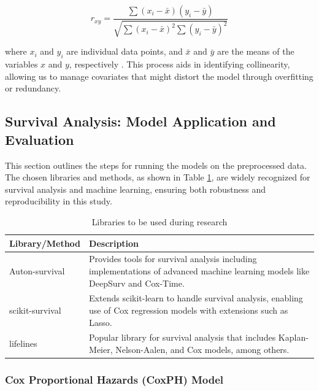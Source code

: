 \[
r_{xy} = \frac{\sum (x_i - \bar{x})(y_i - \bar{y})}{\sqrt{\sum (x_i - \bar{x})^2 \sum (y_i - \bar{y})^2}}
\]

where \( x_i \) and \( y_i \) are individual data points, and \( \bar{x} \) and \( \bar{y} \) are the means of the variables \( x \) and \( y \), respectively \parencite{harrell__regression_2015}. This process aids in identifying collinearity, allowing us to manage covariates that might distort the model through overfitting or redundancy.


\subsection{Survival Analysis: Model Application and Evaluation}

\noindent This section outlines the steps for running the models on the preprocessed data. The chosen libraries and methods, as shown in Table \ref{tab:libs}, are widely recognized for survival analysis and machine learning, ensuring both robustness and reproducibility in this study.

\begin{table}[h]
\begin{tabularx}{\textwidth}{|X|X|}
\hline
Library/Method & Description \\
\hline
Auton-survival \parencite{nagpal_auton-survival_2022} & Provides tools for survival analysis including implementations of advanced machine learning models like DeepSurv and Cox-Time. \\
\hline
scikit-survival \parencite{sebastian_polsterl_scikit-survival_2023} & Extends scikit-learn \parencite{scikit-learn} to handle survival analysis, enabling use of Cox regression models with extensions such as Lasso. \\
\hline
lifelines \parencite{davidson-pilon_lifelines_2024} & Popular library for survival analysis that includes Kaplan-Meier, Nelson-Aalen, and Cox models, among others. \\
\hline
\end{tabularx}
\caption{Libraries to be used during research}
\label{tab:libs}
\end{table}

\subsubsection*{Cox Proportional Hazards (CoxPH) Model}

